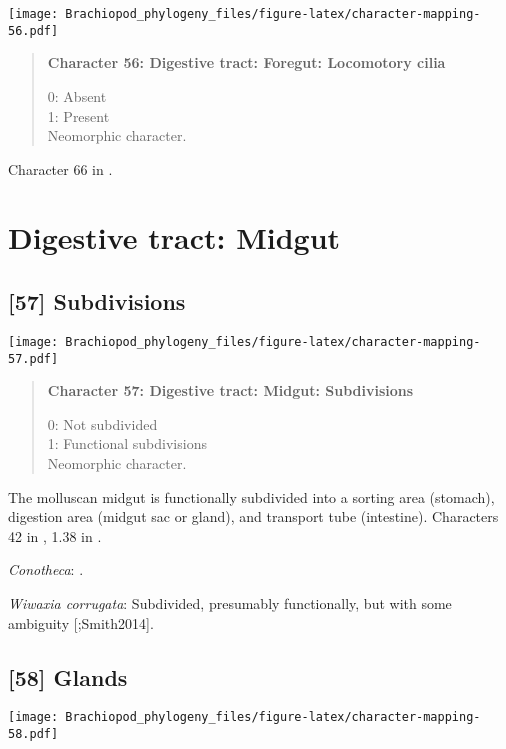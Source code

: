 \documentclass[openany]{book}
\theoremstyle{definition}
\theoremstyle{definition}
\theoremstyle{definition}
\theoremstyle{remark}
\begin{document}
\texttt{[image: Brachiopod\_phylogeny\_files/figure-latex/character-mapping-56.pdf]}

\begin{quote}
\textbf{Character 56: Digestive tract: Foregut: Locomotory cilia}

0: Absent\\
1: Present\\
Neomorphic character.
\end{quote}

Character 66 in \citet{Haszprunar2000}.

\section{Digestive tract: Midgut}\label{digestive-tract-midgut}

\subsection*{{[}57{]} Subdivisions}\label{subdivisions}

\texttt{[image: Brachiopod\_phylogeny\_files/figure-latex/character-mapping-57.pdf]}

\begin{quote}
\textbf{Character 57: Digestive tract: Midgut: Subdivisions}

0: Not subdivided\\
1: Functional subdivisions\\
Neomorphic character.
\end{quote}

The molluscan midgut is functionally subdivided into a sorting area
(stomach), digestion area (midgut sac or gland), and transport tube
(intestine). Characters 42 in \citet{Haszprunar2000}, 1.38 in
\citet{SPS1996}.

\hypertarget{Conotheca-coding-57}{}
\emph{Conotheca}: \citep{Devaere2014}.

\hypertarget{Wiwaxia_corrugata-coding-57}{}
\emph{Wiwaxia corrugata}: Subdivided, presumably functionally, but with
some ambiguity {[}\citet{Smith2012M};Smith2014{]}.

\subsection*{{[}58{]} Glands}\label{glands}

\texttt{[image: Brachiopod\_phylogeny\_files/figure-latex/character-mapping-58.pdf]}
\end{document}
